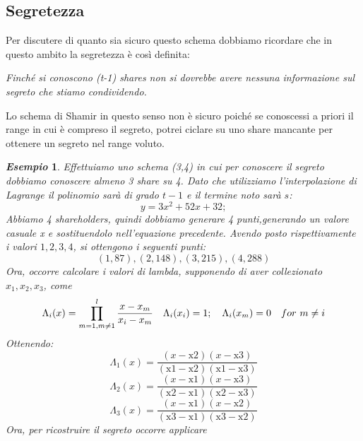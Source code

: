 \documentclass{book}
\newtheorem{esempio}{\emph{Esempio}}
\begin{document}
\subsection{Segretezza}
Per discutere di quanto sia sicuro questo schema dobbiamo ricordare che in questo ambito la segretezza è così definita:
\begin{center}
	\emph{Finché si conoscono (t-1) shares non si dovrebbe avere nessuna informazione sul segreto che stiamo condividendo.}
\end{center}
Lo schema di Shamir in questo senso non è sicuro poiché se conoscessi a priori il range in cui è compreso il segreto, potrei ciclare su uno share mancante per ottenere un segreto nel range voluto\@.
\begin{esempio}
	Effettuiamo uno schema (3,4) in cui per conoscere il segreto dobbiamo conoscere almeno 3 share su 4\@. Dato che utilizziamo l'interpolazione di Lagrange il polinomio sarà di grado \(t-1\) e il termine noto sarà \(s\):
	\begin{equation*}
		y=3 x^2+52 x+32;
	\end{equation*}
	Abbiamo 4 shareholders, quindi dobbiamo generare 4 punti,generando un valore casuale x e sostituendolo nell'equazione precedente. Avendo posto rispettivamente i valori \(1,2,3,4\), si ottengono i seguenti punti:
	\begin{equation*}
		(1,87),(2,148),(3,215),(4,288)
	\end{equation*}
	Ora, occorre calcolare i valori di lambda, supponendo di aver collezionato \(x_{1},x_{2},x_{3}\), come
	\begin{equation*}
		\centering
		\Lambda_{i}(x)=\prod_{m=1,m\neq1}^{l}{\frac{x-x_{m}}{x_{i}-x_{m}}}\quad \Lambda_{i}(x_{i})=1;\quad \Lambda_{i}(x_{m})=0\quad for\ m\neq i
	\end{equation*}
	Ottenendo:
	\begin{equation*}
		\Lambda_{1}(x)=\frac{(x-\text{x2}) (x-\text{x3}) }{(\text{x1}-\text{x2}) (\text{x1}-\text{x3}) }
	\end{equation*}
	\begin{equation*}
		\Lambda_{2}(x)=\frac{(x-\text{x1}) (x-\text{x3}) }{(\text{x2}-\text{x1}) (\text{x2}-\text{x3}) }
	\end{equation*}
	\begin{equation*}
		\Lambda_{3}(x)= \frac{(x-\text{x1}) (x-\text{x2}) }{(\text{x3}-\text{x1}) (\text{x3}-\text{x2}) }
	\end{equation*}
	Ora, per ricostruire il segreto occorre applicare
	\begin{equation*}

\end{equation*}
\end{esempio}
\end{document}
